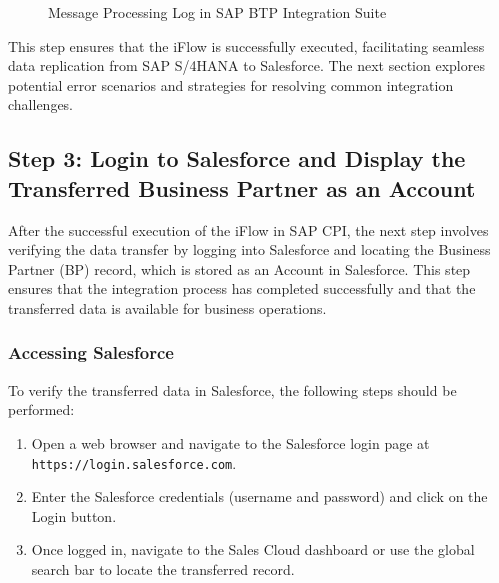     \begin{figure}[H]
    \centering
    \caption{Message Processing Log in SAP BTP Integration Suite}
    
    \end{figure}

This step ensures that the iFlow is successfully executed, facilitating seamless data replication from SAP S/4HANA to Salesforce. The next section explores potential error scenarios and strategies for resolving common integration challenges.

\subsection{Step 3: Login to Salesforce and Display the Transferred Business Partner as an Account}

After the successful execution of the iFlow in SAP CPI, the next step involves verifying the data transfer by logging into Salesforce and locating the Business Partner (BP) record, which is stored as an Account in Salesforce. This step ensures that the integration process has completed successfully and that the transferred data is available for business operations.

\subsubsection{Accessing Salesforce}
To verify the transferred data in Salesforce, the following steps should be performed:

\begin{enumerate}
    \item Open a web browser and navigate to the Salesforce login page at \texttt{https://login.salesforce.com}.
    \item Enter the Salesforce credentials (username and password) and click on the Login button.
    \item Once logged in, navigate to the Sales Cloud dashboard or use the global search bar to locate the transferred record.
\end{enumerate}

